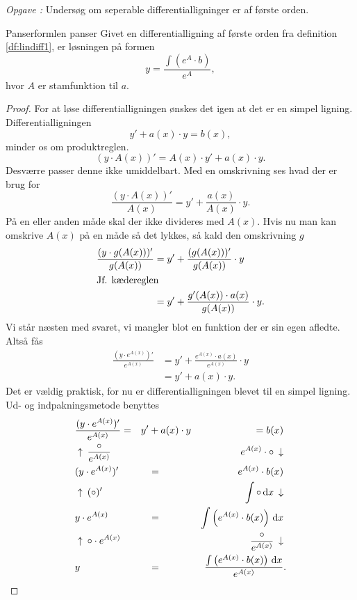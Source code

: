 \documentclass{article}
\newcounter{opgavecnt}
\newcommand{\opg}[1]{\stepcounter{opgavecnt}\textit{Opgave \arabic{opgavecnt}: }#1}
\begin{document}
\opg{Undersøg om seperable differentialligninger er af første orden.}

\smallskip

\begin{theorem}{Panserformlen}
	{panser}
	Givet en differentialligning af første orden fra definition
	\ref{df:lindiff1}, er løsningen på formen
	\[
		y = \frac{\int \left(e^A \cdot b\right)}{e^A},
	\]
	hvor $A$ er stamfunktion til $a$.
\end{theorem}

\begin{proof}
	For at løse differentialligningen ønskes det igen at det er en simpel
	ligning. Differentialligningen
	\[
		y' + a(x) \cdot y = b(x),
	\] 
	minder os om produktreglen.
	\[
		(y \cdot A(x))' = A(x) \cdot y' + a(x) \cdot y.
	\] 
	Desværre passer denne ikke umiddelbart. Med en omskrivning ses hvad der er
	brug for
	\[
		\frac{(y \cdot A(x))'}{A(x)} = y' + \frac{a(x)}{A(x)} \cdot y.
	\] 
	På en eller anden måde skal der ikke divideres med $A(x)$. Hvis nu man kan
	omskrive $A(x)$ på en måde så det lykkes, så kald den omskrivning $g$
	\begin{align*}
		\frac{(y \cdot g(A(x)))'}{g(A(x))} &= y' + \frac{(g(A(x)))'}{g(A(x))} \cdot y\\
		\intertext{Jf. kædereglen}
										   &= y' + \frac{g'(A(x)) \cdot a(x)}{g(A(x))} \cdot y.
	\end{align*}
	Vi står næsten med svaret, vi mangler blot en funktion der er sin egen
	afledte. Altså fås
	\begin{align*}
		\frac{(y \cdot e^{A(x)})'}{e^{A(x)}} &= y' + \frac{e^{A(x)} \cdot a(x)}{e^{A(x)}} \cdot y\\
											 &= y' + a(x) \cdot y.
	\end{align*}
	Det er vældig praktisk, for nu er differentialligningen blevet til en
	simpel ligning. Ud- og indpakningsmetode benyttes
	\begin{align*}
		&\frac{(y \cdot e^{A(x)})'}{e^{A(x)}} =& y' &+ a(x) \cdot y &= b(x)&\\
		&\uparrow\: \frac{\circ}{e^{A(x)}} &&& e^{A(x)} \cdot \circ \: \downarrow&\\
		&(y \cdot e^{A(x)})' &&=& e^{A(x)} \cdot b(x)&\\
		&\uparrow\: ( \circ )' &&& \int \circ \,\mathrm{d} x \: \downarrow&\\
		&y \cdot e^{A(x)} &&=& \int \left(e^{A(x)} \cdot b(x)\right) \,\mathrm{d} x&\\
		&\uparrow\: \circ \cdot e^{A(x)} &&& \frac{\circ}{e^{A(x)}} \: \downarrow&\\
		&y &&=& \frac{\int \left(e^{A(x)} \cdot b(x)\right) \,\mathrm{d} x}{e^{A(x)}}&.\qedhere
	\end{align*}
\end{proof}
\end{document}

